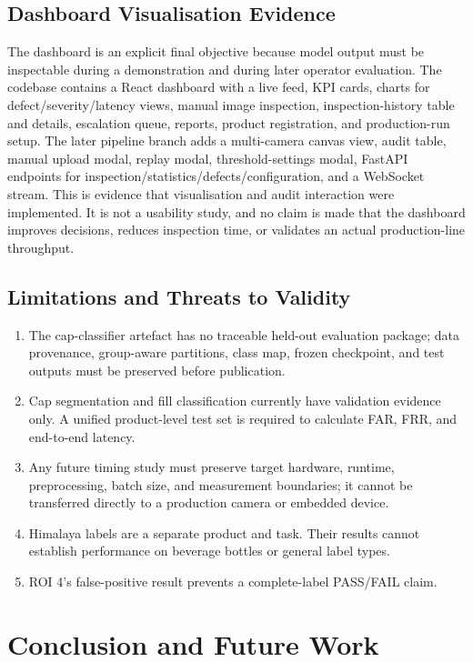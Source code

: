 \documentclass[12pt,a4paper]{report}
\begin{document}
\section{Dashboard Visualisation Evidence}
The dashboard is an explicit final objective because model output must be inspectable during a demonstration and during later operator evaluation. The codebase contains a React dashboard with a live feed, KPI cards, charts for defect/severity/latency views, manual image inspection, inspection-history table and details, escalation queue, reports, product registration, and production-run setup. The later pipeline branch adds a multi-camera canvas view, audit table, manual upload modal, replay modal, threshold-settings modal, FastAPI endpoints for inspection/statistics/defects/configuration, and a WebSocket stream. This is evidence that visualisation and audit interaction were implemented. It is not a usability study, and no claim is made that the dashboard improves decisions, reduces inspection time, or validates an actual production-line throughput.

\section{Limitations and Threats to Validity}
\begin{enumerate}
\item The cap-classifier artefact has no traceable held-out evaluation package; data provenance, group-aware partitions, class map, frozen checkpoint, and test outputs must be preserved before publication.
\item Cap segmentation and fill classification currently have validation evidence only. A unified product-level test set is required to calculate FAR, FRR, and end-to-end latency.
\item Any future timing study must preserve target hardware, runtime, preprocessing, batch size, and measurement boundaries; it cannot be transferred directly to a production camera or embedded device.
\item Himalaya labels are a separate product and task. Their results cannot establish performance on beverage bottles or general label types.
\item ROI 4's false-positive result prevents a complete-label PASS/FAIL claim.
\end{enumerate}

\chapter{Conclusion and Future Work}
\end{document}
